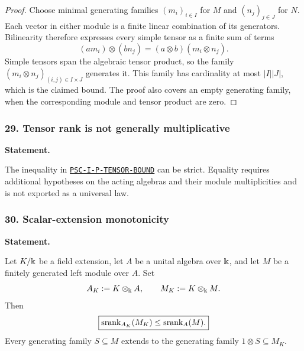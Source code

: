\begin{proof}
Choose minimal generating families $(m_i)_{i\in I}$ for $M$ and $(n_j)_{j\in J}$ for $N$. Each vector in either module is a finite linear combination of its generators. Bilinearity therefore expresses every simple tensor as a finite sum of terms
\[
(am_i)\otimes(bn_j)=(a\otimes b)(m_i\otimes n_j).
\]
Simple tensors span the algebraic tensor product, so the family $(m_i\otimes n_j)_{(i,j)\in I\times J}$ generates it. This family has cardinality at most $|I||J|$, which is the claimed bound. The proof also covers an empty generating family, when the corresponding module and tensor product are zero.
\end{proof}
\subsubsection*{29. Tensor rank is not generally multiplicative}
\label{rec:PSC-I-B-TENSOR-NONEQUALITY}
\textbf{Statement.}\par
The inequality in \hyperref[rec:PSC-I-P-TENSOR-BOUND]{\nolinkurl{PSC-I-P-TENSOR-BOUND}} can be strict.  Equality requires additional hypotheses on the acting algebras and their module multiplicities and is not exported as a universal law.
\subsubsection*{30. Scalar-extension monotonicity}
\label{rec:PSC-I-P-SCALAR-EXTENSION-MONOTONICITY}
\textbf{Statement.}\par
Let \(K/\Bbbk\) be a field extension, let \(A\) be a unital algebra over \(\Bbbk\), and let \(M\) be a finitely generated left module over \(A\).  Set
\[
A_K:=K\otimes_{\Bbbk}A,
\qquad
M_K:=K\otimes_{\Bbbk}M.
\]
Then
\[
\boxed{
\operatorname{srank}_{A_K}(M_K)\leq\operatorname{srank}_A(M).
}
\]
Every generating family \(S\subseteq M\) extends to the generating family \(1\otimes S\subseteq M_K\).

